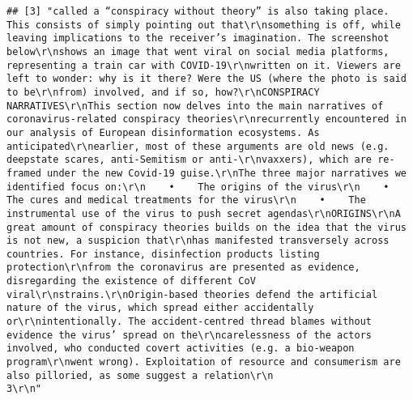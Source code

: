 \documentclass[
]{book}
\begin{document}
\begin{verbatim}
## [3] "called a “conspiracy without theory” is also taking place. This consists of simply pointing out that\r\nsomething is off, while leaving implications to the receiver’s imagination. The screenshot below\r\nshows an image that went viral on social media platforms, representing a train car with COVID-19\r\nwritten on it. Viewers are left to wonder: why is it there? Were the US (where the photo is said to be\r\nfrom) involved, and if so, how?\r\nCONSPIRACY NARRATIVES\r\nThis section now delves into the main narratives of coronavirus-related conspiracy theories\r\nrecurrently encountered in our analysis of European disinformation ecosystems. As anticipated\r\nearlier, most of these arguments are old news (e.g. deepstate scares, anti-Semitism or anti-\r\nvaxxers), which are re-framed under the new Covid-19 guise.\r\nThe three major narratives we identified focus on:\r\n    •    The origins of the virus\r\n    •    The cures and medical treatments for the virus\r\n    •    The instrumental use of the virus to push secret agendas\r\nORIGINS\r\nA great amount of conspiracy theories builds on the idea that the virus is not new, a suspicion that\r\nhas manifested transversely across countries. For instance, disinfection products listing protection\r\nfrom the coronavirus are presented as evidence, disregarding the existence of different CoV viral\r\nstrains.\r\nOrigin-based theories defend the artificial nature of the virus, which spread either accidentally or\r\nintentionally. The accident-centred thread blames without evidence the virus’ spread on the\r\ncarelessness of the actors involved, who conducted covert activities (e.g. a bio-weapon program\r\nwent wrong). Exploitation of resource and consumerism are also pilloried, as some suggest a relation\r\n                                                                                                     3\r\n"                                                                                                                                                                                                                                                                                                                                                                                                                                                                                                                                                                                                                                                                                                                                                                                                                                                                                                                                                                                                                                                                                                                                                                                                                                                                                                                                                                                                                                                                                      
\end{verbatim}
\end{document}
